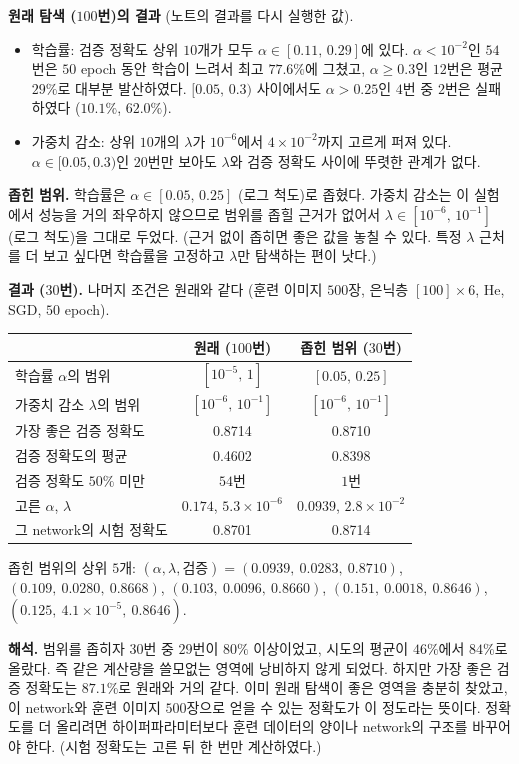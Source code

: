 \documentclass[11pt,a4paper]{article}
\begin{document}
\begin{problems}
\begin{sol}
\textbf{원래 탐색 ($100$번)의 결과} (노트의 결과를 다시 실행한 값).
\begin{itemize}[leftmargin=1.5em,itemsep=1pt]
\item 학습률: 검증 정확도 상위 $10$개가 모두 $\alpha\in[0.11,\,0.29]$에 있다.
$\alpha<10^{-2}$인 $54$번은 $50$ epoch 동안 학습이 느려서 최고 $77.6\%$에 그쳤고,
$\alpha\ge0.3$인 $12$번은 평균 $29\%$로 대부분 발산하였다.
$[0.05,\,0.3)$ 사이에서도 $\alpha>0.25$인 $4$번 중 $2$번은 실패하였다 ($10.1\%$, $62.0\%$).
\item 가중치 감소: 상위 $10$개의 $\lambda$가 $10^{-6}$에서 $4\times10^{-2}$까지 고르게 퍼져 있다.
$\alpha\in[0.05,0.3)$인 $20$번만 보아도 $\lambda$와 검증 정확도 사이에 뚜렷한 관계가 없다.
\end{itemize}

\textbf{좁힌 범위.} 학습률은 $\boxed{\alpha\in[0.05,\,0.25]}$ (로그 척도)로 좁혔다.
가중치 감소는 이 실험에서 성능을 거의 좌우하지 않으므로 범위를 좁힐 근거가 없어서 $\lambda\in[10^{-6},\,10^{-1}]$ (로그 척도)을 그대로 두었다.
(근거 없이 좁히면 좋은 값을 놓칠 수 있다. 특정 $\lambda$ 근처를 더 보고 싶다면 학습률을 고정하고 $\lambda$만 탐색하는 편이 낫다.)

\textbf{결과 ($30$번).} 나머지 조건은 원래와 같다 (훈련 이미지 $500$장, 은닉층 $[100]\times6$, He, SGD, $50$ epoch).
\begin{center}
\begin{tabular}{lcc}
\toprule
 & 원래 ($100$번) & 좁힌 범위 ($30$번) \\
\midrule
학습률 $\alpha$의 범위 & $[10^{-5},\,1]$ & $[0.05,\,0.25]$ \\
가중치 감소 $\lambda$의 범위 & $[10^{-6},\,10^{-1}]$ & $[10^{-6},\,10^{-1}]$ \\
가장 좋은 검증 정확도 & 0.8714 & 0.8710 \\
검증 정확도의 평균 & 0.4602 & 0.8398 \\
검증 정확도 $50\%$ 미만 & $54$번 & $1$번 \\
고른 $\alpha$, $\lambda$ & $0.174$, $5.3\times10^{-6}$ & $0.0939$, $2.8\times10^{-2}$ \\
그 network의 시험 정확도 & 0.8701 & 0.8714 \\
\bottomrule
\end{tabular}
\end{center}
좁힌 범위의 상위 $5$개: $(\alpha,\lambda,\text{검증})=(0.0939,\ 0.0283,\ 0.8710)$, $(0.109,\ 0.0280,\ 0.8668)$,
$(0.103,\ 0.0096,\ 0.8660)$, $(0.151,\ 0.0018,\ 0.8646)$, $(0.125,\ 4.1\times10^{-5},\ 0.8646)$.

\textbf{해석.} 범위를 좁히자 $30$번 중 $29$번이 $80\%$ 이상이었고, 시도의 평균이 $46\%$에서 $84\%$로 올랐다.
즉 같은 계산량을 쓸모없는 영역에 낭비하지 않게 되었다.
하지만 가장 좋은 검증 정확도는 $87.1\%$로 원래와 거의 같다.
이미 원래 탐색이 좋은 영역을 충분히 찾았고, 이 network와 훈련 이미지 $500$장으로 얻을 수 있는 정확도가 이 정도라는 뜻이다.
정확도를 더 올리려면 하이퍼파라미터보다 훈련 데이터의 양이나 network의 구조를 바꾸어야 한다.
(시험 정확도는 고른 뒤 한 번만 계산하였다.)
\end{sol}

\end{problems}
\end{document}
